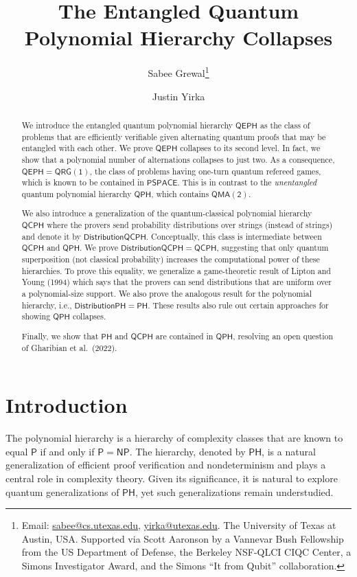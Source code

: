 \documentclass[11pt]{article}
\title{The Entangled Quantum Polynomial Hierarchy Collapses}
\author{
     Sabee Grewal\thanks{Email: \href{mailto:sabee@cs.utexas.edu}{sabee@cs.utexas.edu}, \href{mailto:yirka@utexas.edu}{yirka@utexas.edu}. The University of Texas at Austin, USA. Supported via Scott Aaronson by a Vannevar Bush Fellowship from the US Department of Defense, the Berkeley NSF-QLCI CIQC Center, a Simons Investigator Award, and the Simons “It from Qubit” collaboration.}
     \and 
     Justin Yirka\footnotemark[1] 
 }
\date{}
\theoremstyle{definition}
\newcommand{\class}[1]{\ensuremath{\mathsf{#1}}\xspace}
\newcommand{\PTIME}{\class{P}}
\newcommand{\NP}{\class{NP}}
\newcommand{\PSPACE}{\class{PSPACE}}
\newcommand{\QMAk}[1][k]{\class{QMA(#1)}}
\newcommand{\QMAtwo}{\QMAk[2]}
\newcommand{\QRGk}[1][k]{\class{QRG(#1)}}
\newcommand{\PH}{\class{PH}}
\newcommand{\QCPH}{\class{QCPH}}
\newcommand{\QPH}{\class{QPH}}
\newcommand{\QEPH}{\class{QEPH}}
\newcommand{\distributionQCPH}{\mathsf{DistributionQCPH}}
\newcommand{\mixedPH}{\class{DistributionPH}}
\begin{document}
\maketitle

\begin{abstract}

We introduce the entangled quantum polynomial hierarchy $\QEPH$ as the class of problems that are efficiently verifiable given alternating quantum proofs that may be entangled with each other.
We prove $\QEPH$ collapses to its second level. In fact, we show that a polynomial number of alternations collapses to just two.
As a consequence, $\QEPH = \QRGk[1]$, the class of problems having one-turn quantum refereed games, which is known to be contained in $\PSPACE$.
This is in contrast to the \emph{unentangled} quantum polynomial hierarchy $\QPH$, which contains $\QMAtwo$.


We also introduce a generalization of the quantum-classical polynomial hierarchy $\QCPH$ where the provers send probability distributions over strings (instead of strings) and denote it by $\distributionQCPH$. 
Conceptually, this class is intermediate between $\QCPH$ and $\QPH$. 
We prove $\distributionQCPH = \QCPH$, suggesting that only quantum superposition (not classical probability) increases the computational power of these hierarchies. 
To prove this equality, we generalize a game-theoretic result of Lipton and Young (1994) which says that the provers can send distributions that are uniform over a polynomial-size support. 
We also prove the analogous result for the polynomial hierarchy, i.e., $\mixedPH = \PH$.
These results also rule out certain approaches for showing $\QPH$ collapses.


Finally, we show that $\PH$ and $\QCPH$ are contained in $\QPH$, resolving an open question of Gharibian et al.\ (2022).
\end{abstract}


\section{Introduction}\label{sec:intro}

The polynomial hierarchy \cite{meyer1972equivalence,stockmeyer1976polynomial} is a hierarchy of complexity classes that are known to equal $\PTIME$ if and only if $\PTIME = \NP$. 
The hierarchy, denoted by $\PH$, is a natural generalization of efficient proof verification and nondeterminism and plays a central role in complexity theory. 
Given its significance, it is natural to explore quantum generalizations of $\PH$, yet such generalizations remain understudied. 
\end{document}
